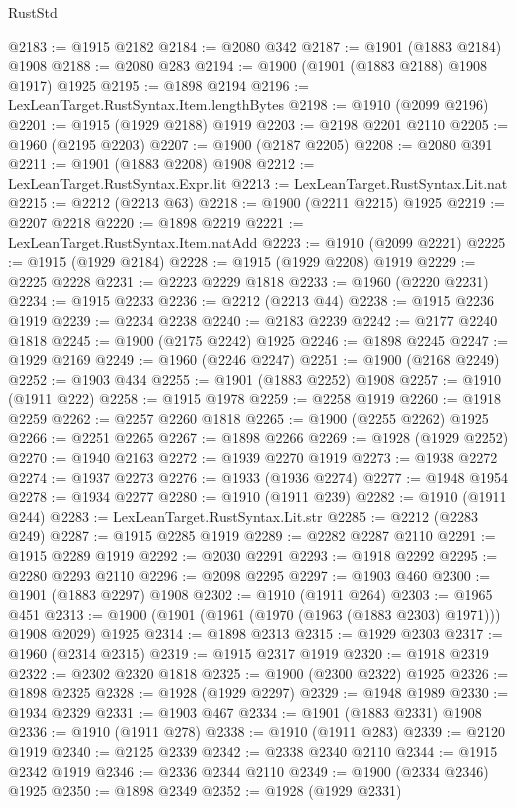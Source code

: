 \begin{lexlean}{RustStd}
\begin{coremodule}
{\begin{coremodule}
{{{{{{{{{{{{{{{{{{{{{{{{{{{{{{{{{{{{{{{{{{{@2183 := @1915 @2182
@2184 := @2080 @342
@2187 := @1901 (@1883 @2184) @1908
@2188 := @2080 @283
@2194 := @1900 (@1901 (@1883 @2188) @1908 @1917) @1925
@2195 := @1898 @2194
@2196 := LexLeanTarget.RustSyntax.Item.lengthBytes
@2198 := @1910 (@2099 @2196)
@2201 := @1915 (@1929 @2188) @1919
@2203 := @2198 @2201 @2110
@2205 := @1960 (@2195 @2203)
@2207 := @1900 (@2187 @2205)
@2208 := @2080 @391
@2211 := @1901 (@1883 @2208) @1908
@2212 := LexLeanTarget.RustSyntax.Expr.lit
@2213 := LexLeanTarget.RustSyntax.Lit.nat
@2215 := @2212 (@2213 @63)
@2218 := @1900 (@2211 @2215) @1925
@2219 := @2207 @2218
@2220 := @1898 @2219
@2221 := LexLeanTarget.RustSyntax.Item.natAdd
@2223 := @1910 (@2099 @2221)
@2225 := @1915 (@1929 @2184)
@2228 := @1915 (@1929 @2208) @1919
@2229 := @2225 @2228
@2231 := @2223 @2229 @1818
@2233 := @1960 (@2220 @2231)
@2234 := @1915 @2233
@2236 := @2212 (@2213 @44)
@2238 := @1915 @2236 @1919
@2239 := @2234 @2238
@2240 := @2183 @2239
@2242 := @2177 @2240 @1818
@2245 := @1900 (@2175 @2242) @1925
@2246 := @1898 @2245
@2247 := @1929 @2169
@2249 := @1960 (@2246 @2247)
@2251 := @1900 (@2168 @2249)
@2252 := @1903 @434
@2255 := @1901 (@1883 @2252) @1908
@2257 := @1910 (@1911 @222)
@2258 := @1915 @1978
@2259 := @2258 @1919
@2260 := @1918 @2259
@2262 := @2257 @2260 @1818
@2265 := @1900 (@2255 @2262) @1925
@2266 := @2251 @2265
@2267 := @1898 @2266
@2269 := @1928 (@1929 @2252)
@2270 := @1940 @2163
@2272 := @1939 @2270 @1919
@2273 := @1938 @2272
@2274 := @1937 @2273
@2276 := @1933 (@1936 @2274)
@2277 := @1948 @1954
@2278 := @1934 @2277
@2280 := @1910 (@1911 @239)
@2282 := @1910 (@1911 @244)
@2283 := LexLeanTarget.RustSyntax.Lit.str
@2285 := @2212 (@2283 @249)
@2287 := @1915 @2285 @1919
@2289 := @2282 @2287 @2110
@2291 := @1915 @2289 @1919
@2292 := @2030 @2291
@2293 := @1918 @2292
@2295 := @2280 @2293 @2110
@2296 := @2098 @2295
@2297 := @1903 @460
@2300 := @1901 (@1883 @2297) @1908
@2302 := @1910 (@1911 @264)
@2303 := @1965 @451
@2313 := @1900 (@1901 (@1961 (@1970 (@1963 (@1883 @2303) @1971))) @1908 @2029) @1925
@2314 := @1898 @2313
@2315 := @1929 @2303
@2317 := @1960 (@2314 @2315)
@2319 := @1915 @2317 @1919
@2320 := @1918 @2319
@2322 := @2302 @2320 @1818
@2325 := @1900 (@2300 @2322) @1925
@2326 := @1898 @2325
@2328 := @1928 (@1929 @2297)
@2329 := @1948 @1989
@2330 := @1934 @2329
@2331 := @1903 @467
@2334 := @1901 (@1883 @2331) @1908
@2336 := @1910 (@1911 @278)
@2338 := @1910 (@1911 @283)
@2339 := @2120 @1919
@2340 := @2125 @2339
@2342 := @2338 @2340 @2110
@2344 := @1915 @2342 @1919
@2346 := @2336 @2344 @2110
@2349 := @1900 (@2334 @2346) @1925
@2350 := @1898 @2349
@2352 := @1928 (@1929 @2331)
}}}}}}}}}}}}}}}}}}}}}}}}}}}}}}}}}}}}}}}}}}}
\end{coremodule}}
\end{coremodule}
\end{lexlean}
